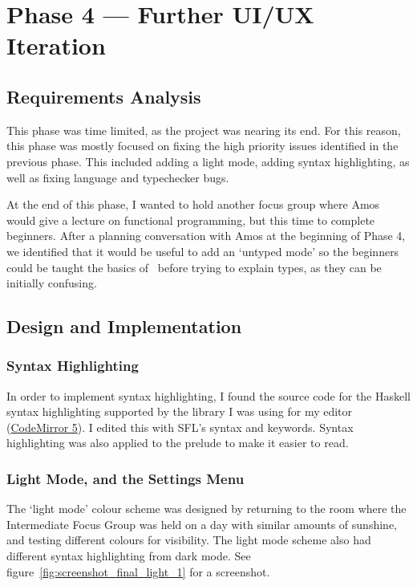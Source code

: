 \chapter{Phase 4 --- Further UI/UX Iteration}
\section{Requirements Analysis}
This phase was time limited, as the project was nearing its end. For this reason, this phase was mostly focused on fixing the high priority issues identified in the previous phase. This included adding a light mode, adding syntax highlighting, as well as fixing language and typechecker bugs. 

At the end of this phase, I wanted to hold another focus group where Amos would give a lecture on functional programming, but this time to complete beginners. After a planning conversation with Amos at the beginning of Phase 4, we identified that it would be useful to add an `untyped mode' so the beginners could be taught the basics of \lcalc\ before trying to explain types, as they can be initially confusing. 

\section{Design and Implementation}
\subsection{Syntax Highlighting}
In order to implement syntax highlighting, I found the source code for the Haskell syntax highlighting supported by the library I was using for my editor (\href{https://codemirror.net/5/}{CodeMirror 5}). I edited this with SFL's syntax and keywords. Syntax highlighting was also applied to the prelude to make it easier to read. 

\subsection{Light Mode, and the Settings Menu}
The `light mode' colour scheme was designed by returning to the room where the Intermediate Focus Group was held on a day with similar amounts of sunshine, and testing different colours for visibility. The light mode scheme also had different syntax highlighting from dark mode. See figure~\ref{fig:screenshot_final_light_1} for a screenshot. 

